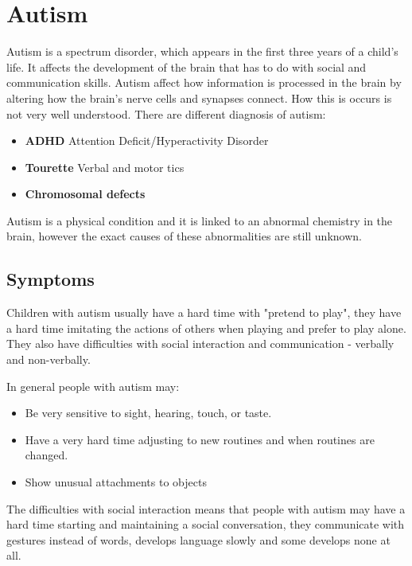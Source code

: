 \section{Autism}

Autism is a spectrum disorder, which appears in the first three years of a child's life. It affects the development of the brain that has to do with social and communication skills. Autism affect how information is processed in the brain by altering how the brain's nerve cells and synapses connect. How this is occurs is not very well understood.\citep{autism} There are different diagnosis of autism:

\begin{itemize}
\item \textbf{ADHD} Attention Deficit/Hyperactivity Disorder
\item \textbf{Tourette} Verbal and motor tics
\item \textbf{Chromosomal defects}
\end{itemize}

Autism is a physical condition and it is linked to an abnormal chemistry in the brain, however the exact causes of these abnormalities are still unknown.\citep{autism} 

\subsection*{Symptoms} 

Children with autism usually have a hard time with "pretend to play", they have a hard time imitating the actions of others when playing and prefer to play alone. They also have difficulties with social interaction and communication - verbally and non-verbally. 

In general people with autism may:

\begin{itemize}
\item Be very sensitive to sight, hearing, touch, or taste.
\item Have a very hard time adjusting to new routines and when routines are changed.
\item Show unusual attachments to objects
\end{itemize} 

The difficulties with social interaction means that people with autism may have a hard time starting and maintaining a social conversation, they communicate with gestures instead of words, develops language slowly and some develops none at all. 

